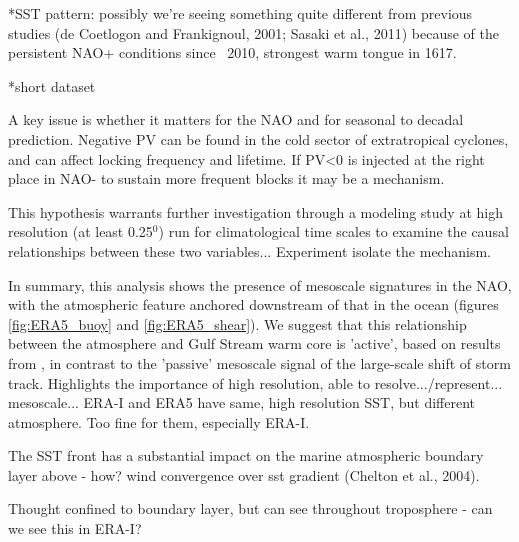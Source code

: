 *SST pattern: possibly we’re seeing something quite different from previous studies (de Coetlogon and Frankignoul, 2001; Sasaki et al., 2011) because of the persistent NAO+ conditions since ~2010, strongest warm tongue in 1617.

*short dataset

A key issue is whether it matters for the NAO and for seasonal to decadal prediction. Negative PV can be found in the cold sector of extratropical cyclones, and can affect locking frequency and lifetime. If PV<0 is injected at the right place in NAO- to sustain more frequent blocks it may be a mechanism.



This hypothesis warrants further investigation through a modeling study at high resolution (at least 0.25$^{0}$) run for climatological time scales to examine the causal relationships between these two variables... Experiment isolate the mechanism.

In summary, this analysis shows the presence of mesoscale signatures in the NAO, with the atmospheric feature anchored downstream of that in the ocean (figures \ref{fig:ERA5_buoy} and \ref{fig:ERA5_shear}). We suggest that this relationship between the atmosphere and  Gulf Stream warm core is 'active', based on results from \citet{sheldon2017warm}, in contrast to the 'passive' mesoscale signal of the large-scale shift of storm track. Highlights the importance of high resolution, able to resolve.../represent... mesoscale... ERA-I and ERA5 have same, high resolution SST, but different atmosphere. Too fine for them, especially ERA-I.



The SST front has a substantial impact on the marine atmospheric boundary layer above - how? wind convergence over sst gradient (Chelton et al., 2004).

Thought confined to boundary layer, but can see throughout troposphere - can we see this in ERA-I?




